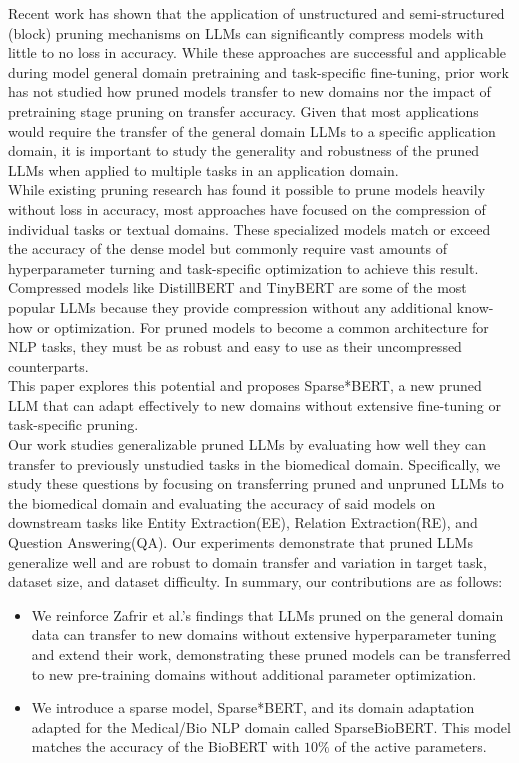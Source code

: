 \documentclass[10pt]{article}
\begin{document}
Recent work \cite{Zafrir2021PruneOF} \cite{Kurti2022TheOB} has shown that the application of unstructured and semi-structured (block) pruning mechanisms on LLMs can significantly compress models with little to no loss in accuracy. While these approaches are successful and applicable during model general domain pretraining and task-specific fine-tuning, prior work has not studied how pruned models transfer to new domains nor the impact of pretraining stage pruning on transfer accuracy. Given that most applications would require the transfer of the general domain LLMs to a specific application domain, it is important to study the generality and robustness of the pruned LLMs when applied to multiple tasks in an application domain.  \\
While existing pruning research has found it possible to prune models heavily without loss in accuracy, most approaches have focused on the compression of individual tasks or textual domains. These specialized models match or exceed the accuracy of the dense model but commonly require vast amounts of hyperparameter turning and task-specific optimization to achieve this result. Compressed models like DistillBERT \cite{Sanh2019DistilBERTAD} and TinyBERT \cite{Jiao2020TinyBERTDB} are some of the most popular LLMs because they provide compression without any additional know-how or optimization. For pruned models to become a common architecture for NLP tasks, they must be as robust and easy to use as their uncompressed counterparts. \\
This paper explores this potential and proposes Sparse*BERT, a new pruned LLM that can adapt effectively to new domains without extensive fine-tuning or task-specific pruning.\\
Our work studies generalizable pruned LLMs by evaluating how well they can transfer to previously unstudied tasks in the biomedical domain.
Specifically, we study these questions by focusing on transferring pruned and unpruned LLMs to the biomedical domain and evaluating the accuracy of said models on downstream tasks like Entity Extraction(EE), Relation Extraction(RE), and Question Answering(QA). Our experiments demonstrate that pruned LLMs generalize well and are robust to domain transfer and variation in target task, dataset size, and dataset difficulty. In summary, our contributions are as follows:
\begin{itemize} 
\item We reinforce Zafrir et al.'s findings that LLMs pruned on the general domain data can transfer to new domains without extensive hyperparameter tuning and extend their work, demonstrating these pruned models can be transferred to new pre-training domains without additional parameter optimization.
\item We introduce a sparse model, Sparse*BERT, and its domain adaptation adapted for the Medical/Bio NLP domain called SparseBioBERT. This model matches the accuracy of the BioBERT with $10\%$ of the active parameters.
\end{itemize}
\end{document}
